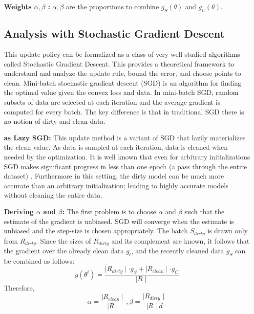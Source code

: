 \vspace{0.25em}

\noindent\textbf{Weights $\alpha,\beta$ : } $\alpha,\beta$ are the proportions to combine $g_S(\theta)$ and $g_C(\theta)$. 

\subsection{Analysis with Stochastic Gradient Descent}\label{sgd}
This update policy can be formalized as a class of very well studied algorithms called Stochastic Gradient Descent.
This provides a theoretical framework to understand and analyze the update rule, bound the error, and choose points to clean.
Mini-batch stochastic gradient descent (SGD) is an algorithm for finding the optimal value
given the convex loss and data.
In mini-batch SGD, random subsets of data are selected at each iteration and the average gradient is computed for every batch.
The key difference is that in traditional SGD there is no notion of dirty and clean data.

\vspace{0.25em}

\noindent\textbf{ \sys as Lazy SGD: } This update method is a variant of SGD that lazily materializes the clean value.
As data is sampled at each iteration, data is cleaned when needed by the optimization.
It is well known that even for arbitrary initializations SGD makes significant progress in less than one epoch (a pass through the entire dataset) \cite{bottou2012stochastic}.
Furthermore in this setting, the dirty model can be much more accurate than an arbitrary initialization; leading to highly accurate models without cleaning the entire data.

\vspace{0.25em}

\noindent\textbf{Deriving $\alpha$ and $\beta$: } The first problem is to choose $\alpha$ and $\beta$ such that the estimate of the gradient is unbiased. 
SGD will converge when the estimate is unbiased and the step-size is chosen appropriately.
The batch $S_{dirty}$ is drawn only from $R_{dirty}$.
Since the sizes of $R_{dirty}$ and its complement are known, it follows that the gradient over the already clean data $g_C$ and the recently cleaned data $g_S$ can be combined as follows:
\[
g(\theta^{t}) = \frac{\mid R_{dirty} \mid \cdot g_S + \mid R_{clean} \mid \cdot g_C  }{\mid R \mid}
\]
Therefore,
\[
\alpha = \frac{\mid R_{clean} \mid}{\mid R \mid}, \beta = \frac{\mid R_{dirty} \mid}{\mid R \mid d}
\]

